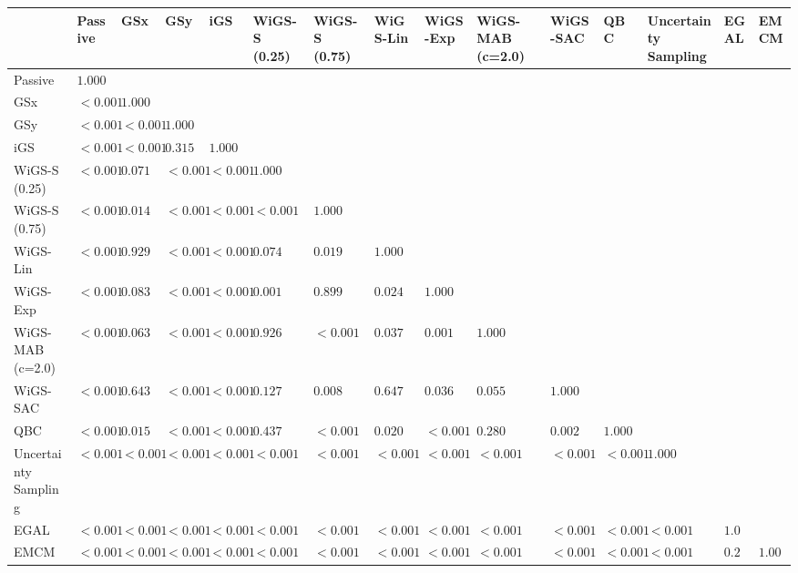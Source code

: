 \begin{tabular}{lllllllllllllll}
\toprule
 & Passive & GSx & GSy & iGS & WiGS-S (0.25) & WiGS-S (0.75) & WiGS-Lin & WiGS-Exp & WiGS-MAB (c=2.0) & WiGS-SAC & QBC & Uncertainty Sampling & EGAL & EMCM \\
\midrule
Passive & $1.000$ &  &  &  &  &  &  &  &  &  &  &  &  &  \\
GSx & $<0.001$ & $1.000$ &  &  &  &  &  &  &  &  &  &  &  &  \\
GSy & $<0.001$ & $<0.001$ & $1.000$ &  &  &  &  &  &  &  &  &  &  &  \\
iGS & $<0.001$ & $<0.001$ & $0.315$ & $1.000$ &  &  &  &  &  &  &  &  &  &  \\
WiGS-S (0.25) & $<0.001$ & $0.071$ & $<0.001$ & $<0.001$ & $1.000$ &  &  &  &  &  &  &  &  &  \\
WiGS-S (0.75) & $<0.001$ & $0.014$ & $<0.001$ & $<0.001$ & $<0.001$ & $1.000$ &  &  &  &  &  &  &  &  \\
WiGS-Lin & $<0.001$ & $0.929$ & $<0.001$ & $<0.001$ & $0.074$ & $0.019$ & $1.000$ &  &  &  &  &  &  &  \\
WiGS-Exp & $<0.001$ & $0.083$ & $<0.001$ & $<0.001$ & $0.001$ & $0.899$ & $0.024$ & $1.000$ &  &  &  &  &  &  \\
WiGS-MAB (c=2.0) & $<0.001$ & $0.063$ & $<0.001$ & $<0.001$ & $0.926$ & $<0.001$ & $0.037$ & $0.001$ & $1.000$ &  &  &  &  &  \\
WiGS-SAC & $<0.001$ & $0.643$ & $<0.001$ & $<0.001$ & $0.127$ & $0.008$ & $0.647$ & $0.036$ & $0.055$ & $1.000$ &  &  &  &  \\
QBC & $<0.001$ & $0.015$ & $<0.001$ & $<0.001$ & $0.437$ & $<0.001$ & $0.020$ & $<0.001$ & $0.280$ & $0.002$ & $1.000$ &  &  &  \\
Uncertainty Sampling & $<0.001$ & $<0.001$ & $<0.001$ & $<0.001$ & $<0.001$ & $<0.001$ & $<0.001$ & $<0.001$ & $<0.001$ & $<0.001$ & $<0.001$ & $1.000$ &  &  \\
EGAL & $<0.001$ & $<0.001$ & $<0.001$ & $<0.001$ & $<0.001$ & $<0.001$ & $<0.001$ & $<0.001$ & $<0.001$ & $<0.001$ & $<0.001$ & $<0.001$ & $1.000$ &  \\
EMCM & $<0.001$ & $<0.001$ & $<0.001$ & $<0.001$ & $<0.001$ & $<0.001$ & $<0.001$ & $<0.001$ & $<0.001$ & $<0.001$ & $<0.001$ & $<0.001$ & $0.288$ & $1.000$ \\
\bottomrule
\end{tabular}
